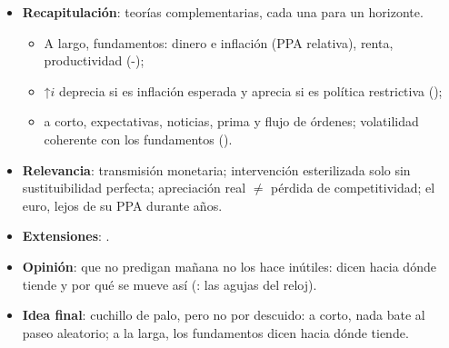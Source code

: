 \documentclass{article}
\begin{document}
\begin{columnas}
\begin{itemize}
\item \textbf{Recapitulación}: teorías complementarias, cada una para un horizonte.
  \begin{itemize}
  \item A largo, fundamentos: dinero e inflación (PPA relativa), renta, productividad (-);
  \item ↑$i$ deprecia si es inflación esperada y aprecia si es política restrictiva ();
  \item a corto, expectativas, noticias, prima y flujo de órdenes; volatilidad coherente con los fundamentos ().
  \end{itemize}
\item \textbf{Relevancia}: transmisión monetaria; intervención esterilizada solo sin sustituibilidad perfecta; apreciación real $\neq$ pérdida de competitividad; el euro, lejos de su PPA durante años.
\item \textbf{Extensiones}:     .
\item \textbf{Opinión}: que no predigan mañana no los hace inútiles: dicen hacia dónde tiende y por qué se mueve así (: las agujas del reloj).
\item \textbf{Idea final}: cuchillo de palo, pero no por descuido: a corto, nada bate al paseo aleatorio; a la larga, los fundamentos dicen hacia dónde tiende.
\end{itemize}


\end{columnas}
\end{document}

